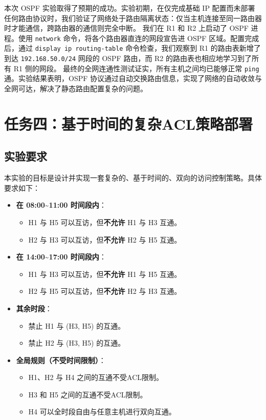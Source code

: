 \documentclass[12pt, a4paper]{article}
\begin{document}
本次 OSPF 实验取得了预期的成功。实验初期，在仅完成基础 IP 配置而未部署任何路由协议时，我们验证了网络处于路由隔离状态：仅当主机连接至同一路由器时才能通信，跨路由器的通信则完全中断。
我们在 R1 和 R2 上启动了 OSPF 进程。使用 \texttt{network} 命令，将各个路由器直连的网段宣告进 OSPF 区域。配置完成后，通过 \texttt{display ip routing-table} 命令检查，我们观察到 R1 的路由表新增了到达 \texttt{192.168.50.0/24} 网段的 OSPF 路由，而 R2 的路由表也相应地学习到了所有 R1 侧的网段。
最终的全网连通性测试证实，所有主机之间均已能够正常 \texttt{ping} 通。实验结果表明，OSPF 协议通过自动交换路由信息，实现了网络的自动收敛与全网可达，解决了静态路由配置复杂的问题。

\newpage
\section{任务四：基于时间的复杂ACL策略部署}

\subsection{实验要求}

本实验的目标是设计并实现一套复杂的、基于时间的、双向的访问控制策略。具体要求如下：

\begin{itemize}
    \item \textbf{在 08:00\textasciitilde 11:00 时间段内}：
    \begin{itemize}
        \item H1 与 H5 可以互访，但\textbf{不允许} H1 与 H3 互通。
        \item H2 与 H3 可以互访，但\textbf{不允许} H2 与 H5 互通。
    \end{itemize}
    \item \textbf{在 14:00\textasciitilde 17:00 时间段内}：
    \begin{itemize}
        \item H1 与 H3 可以互访，但\textbf{不允许} H1 与 H5 互通。
        \item H2 与 H5 可以互访，但\textbf{不允许} H2 与 H3 互通。
    \end{itemize}
    \item \textbf{其余时段}：
    \begin{itemize}
        \item 禁止 H1 与 (H3, H5) 的互通。
        \item 禁止 H2 与 (H3, H5) 的互通。
    \end{itemize}
    \item \textbf{全局规则（不受时间限制）}：
    \begin{itemize}
        \item H1、H2 与 H4 之间的互通不受ACL限制。
        \item H3 和 H5 之间的互通不受ACL限制。
        \item H4 可以全时段自由与任意主机进行双向互通。
    \end{itemize}
\end{itemize}
\end{document}
